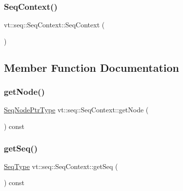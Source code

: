 \subsubsection{\texorpdfstring{Seq\+Context()}{SeqContext()}\hspace{0.1cm}{\footnotesize\ttfamily [3/3]}}
{\footnotesize\ttfamily vt\+::seq\+::\+Seq\+Context\+::\+Seq\+Context (\begin{DoxyParamCaption}\item[{\hyperlink{structvt_1_1seq_1_1_seq_context}{Seq\+Context} const \&}]{ }\end{DoxyParamCaption})\hspace{0.3cm}{\ttfamily [delete]}}



\subsection{Member Function Documentation}
\mbox{\label{structvt_1_1seq_1_1_seq_context_a9fd5265c51699de8e5a33e297333bd45}} 
\subsubsection{\texorpdfstring{get\+Node()}{getNode()}}
{\footnotesize\ttfamily \hyperlink{namespacevt_1_1seq_ae6a4874b585be0612aaca32ca6d2d191}{Seq\+Node\+Ptr\+Type} vt\+::seq\+::\+Seq\+Context\+::get\+Node (\begin{DoxyParamCaption}{ }\end{DoxyParamCaption}) const}

\mbox{\label{structvt_1_1seq_1_1_seq_context_a24fb30ec00c71ae6ae51ba6931957f2a}} 
\subsubsection{\texorpdfstring{get\+Seq()}{getSeq()}}
{\footnotesize\ttfamily \hyperlink{namespacevt_1_1seq_a3b612da217ac669d39c159f134ab8434}{Seq\+Type} vt\+::seq\+::\+Seq\+Context\+::get\+Seq (\begin{DoxyParamCaption}{ }\end{DoxyParamCaption}) const}

